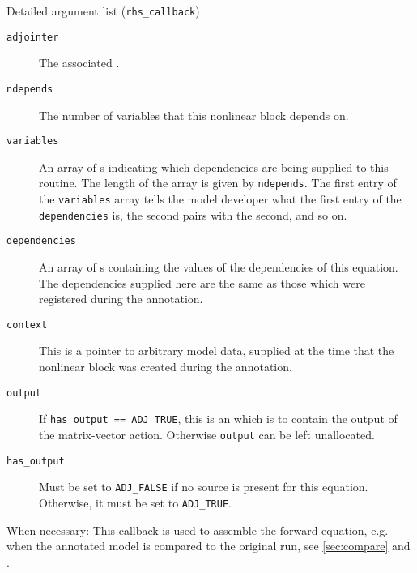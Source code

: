 \begin{boxwithtitle}{Detailed argument list (\texttt{rhs_callback})}
\begin{description}
\item[\texttt{adjointer}] The associated .
\item[\texttt{ndepends}] The number of variables that this nonlinear block depends on.
\item[\texttt{variables}] An array of s indicating which dependencies are being supplied to this routine. The length of the
array is given by \texttt{ndepends}. The first entry of the \texttt{variables} array
tells the model developer what the first entry of the \texttt{dependencies} is, the second pairs with the second, and so on.
\item[\texttt{dependencies}] An array of s containing the values of the dependencies of this equation. The dependencies supplied
here are the same as those which were registered during the annotation.
\item[\texttt{context}] This is a pointer to arbitrary model data, supplied at the time that the nonlinear block was created during the annotation.
\item[\texttt{output}] If \texttt{has_output == ADJ_TRUE}, this is an  which is to contain the output of the matrix-vector action. Otherwise \texttt{output} can be left unallocated.
\item[\texttt{has_output}] Must be set to \texttt{ADJ_FALSE} if no source is present for this equation. Otherwise, it must be set to \texttt{ADJ_TRUE}.
\end{description}
\end{boxwithtitle}

When necessary: 
This callback is used to assemble the forward equation, e.g. when the annotated model is compared to the original run, see \autoref{sec:compare} and .


